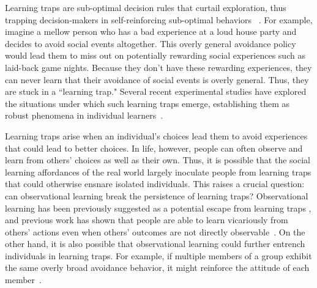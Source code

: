 \documentclass[11pt]{article} %
\begin{document}
Learning traps are sub-optimal decision rules that curtail exploration, thus trapping decision-makers in self-reinforcing sub-optimal behaviors ~\cite{marchExplorationExploitationOrganizational1991a, denrellAdaptationInformationRestriction2001,richLimitsLearningExploration2018, liuExaminingRelationshipEarly2025}. For example, imagine a mellow person who has a bad experience at a loud house party and decides to avoid social events altogether. This overly general avoidance policy would lead them to miss out on potentially rewarding social experiences such as laid-back game nights. Because they don't have these rewarding experiences, they can never learn that their avoidance of social events is overly general. Thus, they are stuck in a ``learning trap." Several recent experimental studies have explored the situations under which such learning traps emerge, establishing them as robust phenomena in individual learners~\cite{erevRecommenderSystemsLearning2014, richLimitsLearningExploration2018, liCanLossesHelp2021, allidinaAvoidanceBegetsAvoidance2021, liquinChildrenAreMore2022, blancoBenefitsImmatureCognitive2023,baiCostlyExplorationProduces2025, watsonRoleAttentionalProcesses2024}. 

Learning traps arise when an individual's choices lead them to avoid experiences that could lead to better choices.  In life, however, people can often observe and learn from others' choices as well as their own. Thus, it is possible that the social learning affordances of the real world largely inoculate people from learning traps that could otherwise ensnare isolated individuals. This raises a crucial question: can observational learning break the persistence of learning traps? Observational learning has been previously suggested as a potential escape from learning traps \cite{allidinaAvoidanceBegetsAvoidance2021}, and previous work has shown that people are able to learn vicariously from others' actions even when others' outcomes are not directly observable~\cite{toyokawaHumanCollectiveIntelligence2014, toyokawaSocialLearningStrategies2019, hawkinsFlexibleSocialInference2023a, ortmannSocialLearningIncomplete2023}. On the other hand, it is also possible that observational learning could further entrench individuals in learning traps. For example, if multiple members of a group exhibit the same overly broad avoidance behavior, it might reinforce the attitude of each member~\cite{schultnerTransmissionSocialBias2024, kashima2000maintaining, giraldeau2002potential, bikhchandani1992theory}.
\end{document}
